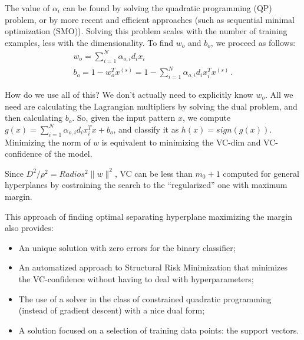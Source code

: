 The value of $\alpha_i$ can be found by solving the quadratic programming (QP) problem, or by more recent and efficient approaches (such as sequential minimal optimization (SMO)). Solving this problem scales with the number of training examples, less with the dimensionality. To find $w_o$ and $b_o$, we proceed as follows:
\begin{gather*}
    w_o = \sum_{i=1}^N \alpha_{o,i} d_i x_i \\
    b_o = 1 - w_o^T x^{(s)} = 1 - \sum_{i=1}^N \alpha_{o,i} d_i x_i^T x^{(s)} \, .
\end{gather*}

How do we use all of this? We don't actually need to explicitly know $w_o$. All we need are calculating the Lagrangian multipliers by solving the dual problem, and then calculating $b_o$. So, given the input pattern $x$, we compute $g(x) = \sum_{i=1}^N \alpha_{o,i} d_i x_i^T x + b_o$, and classify it as $h(x) = sign(g(x))$. Minimizing the norm of $w$ is equivalent to minimizing the VC-dim and VC-confidence of the model.


Since $D^2 / \rho^2 = Radios^2 \|w\|^2$, VC can be less than $m_0 + 1$ computed for general hyperplanes by costraining the search to the ``regularized'' one with maximum margin.

This approach of finding optimal separating hyperplane maximizing the margin also provides:
\begin{itemize}
    \item An unique solution with zero errors for the binary classifier;
    \item An automatized approach to Structural Risk Minimization that minimizes the VC-confidence without having to deal with hyperparameters;
    \item The use of a solver in the class of constrained quadratic programming (instead of gradient descent) with a nice dual form;
    \item A solution focused on a selection of training data points: the support vectors.
\end{itemize}

